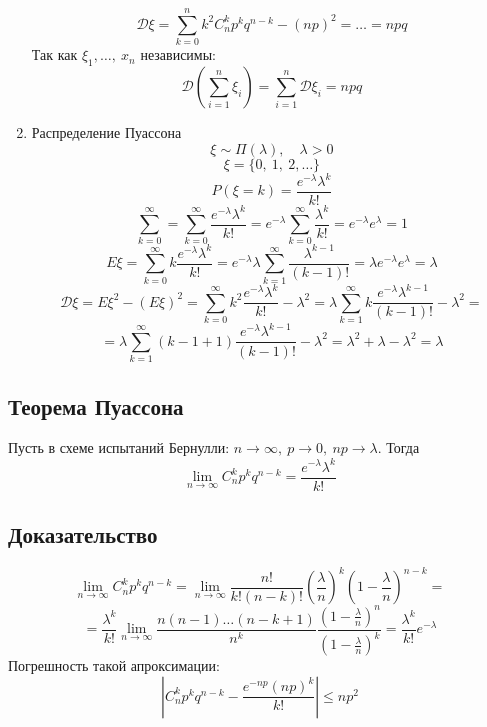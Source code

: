 \documentclass[12pt, a4paper]{article}
\begin{document}
\begin{enumerate}
        \[\mathcal{D}\xi = \sum_{k = 0}^{n}k^2 C_n^k p^k q^{n - k} - (np)^2 = \dots = npq\]
        Так как $\xi_1,\dots,\ x_n$ независимы:
        \[\mathcal{D}\left( \sum\limits_{i = 1}^{n} \xi_i \right) = \sum_{i = 1}^{n} \mathcal{D}\xi_i = npq\]
        \item Распределение Пуассона
        \[\xi\sim \Pi(\lambda),\quad \lambda > 0\]
        \[\xi = \{0,\ 1,\ 2,\dots\}\]
        \[P(\xi = k) = \frac{e^{-\lambda} \lambda^k}{k!}\]
        \[\sum_{k = 0}^{\infty} = \sum_{k = 0}^{\infty}\frac{e^{-\lambda}\lambda^k}{k!} = e^{-\lambda}\sum_{k = 0}^{\infty}\frac{\lambda^k}{k!} = e^{-\lambda} e^{\lambda} = 1\]
        \[E\xi = \sum_{k = 0}^{\infty} k \frac{e^{-\lambda}\lambda^k}{k!} = e^{-\lambda}\lambda\sum_{k = 1}^{\infty}\frac{\lambda^{k - 1}}{(k - 1)!} = \lambda e^{-\lambda}e^{\lambda} = \lambda\]
        \[\mathcal{D}\xi = E\xi^2 - (E\xi)^2 = \sum_{k = 0}^{\infty} k^2\frac{e^{-\lambda}\lambda^k}{k!} - \lambda^2 = \lambda \sum_{k = 1}^{\infty} k \frac{e^{-\lambda}\lambda^{k - 1}}{(k - 1)!} - \lambda^2=\]
        \[=\lambda\sum_{k = 1}^{\infty} (k - 1 + 1) \frac{e^{-\lambda} \lambda^{k - 1}}{(k - 1)!} - \lambda^2 = \lambda^2 + \lambda - \lambda^2 = \lambda\]
    \end{enumerate}
    \subsection*{Теорема Пуассона}
    Пусть в схеме испытаний Бернулли: $n\to \infty,\ p\to 0,\ np\to \lambda$. Тогда 
    \[\lim_{n\to\infty}C_n^k p^k q^{n - k} = \frac{e^{-\lambda}\lambda^k}{k!}\]
    \subsection*{Доказательство}
    \[\lim_{n\to\infty}C_n^k p^k q^{n - k} = \lim_{n\to \infty} \frac{n!}{k!(n - k)!}\left( \frac{\lambda}{n} \right)^k\left( 1 - \frac{\lambda}{n} \right)^{n - k}=\]
    \[= \frac{\lambda^k}{k!} \lim_{n\to \infty} \frac{n(n - 1)\dots(n - k + 1)}{n^k} \frac{(1 - \frac{\lambda}{n})^n}{(1 - \frac{\lambda}{n})^k} = \frac{\lambda^k}{k!}e^{-\lambda}\]
    Погрешность такой апроксимации:
    \[\left|C_n^k p^k q^{n - k} - \frac{e^{-np}(np)^k}{k!}\right| \leq np^2\]
\end{document}

